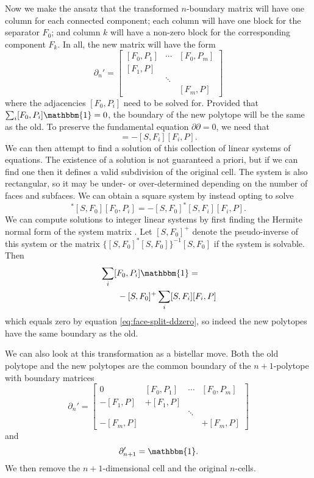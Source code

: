\documentclass[twocolumn]{article}
\begin{document}
Now we make the ansatz that the transformed $n$-boundary matrix will have one column for each connected component; each column will have one block for the separator $F_0$; and column $k$ will have a non-zero block for the corresponding component $F_k$.
In all, the new matrix will have the form
\begin{equation}
    \partial_n' = \left[\begin{matrix}[F_0, P_1] & \cdots & [F_0, P_m] \\ [F_1, P] & & \\ & \ddots & \\ & & [F_m, P]\end{matrix}\right]
\end{equation}
where the adjacencies $[F_0, P_i]$ need to be solved for.
Provided that $\sum_i[F_0, P_i]\mathbbm{1} = 0$, the boundary of the new polytope will be the same as the old.
To preserve the fundamental equation $\partial\partial = 0$, we need that
\begin{equation}
    [S, F_0][F_0, P_i] = -[S, F_i][F_i, P].
\end{equation}
We can then attempt to find a solution of this collection of linear systems of equations.
The existence of a solution is not guaranteed a priori, but if we can find one then it defines a valid subdivision of the original cell.
The system is also rectangular, so it may be under- or over-determined depending on the number of faces and subfaces.
We can obtain a square system by instead opting to solve
\begin{equation}
    [S, F_0]^*[S, F_0][F_0, P_i] = -[S, F_0]^*[S, F_i][F_i, P].
    \label{eq:face-split-normal-eqn}
\end{equation}
We can compute solutions to integer linear systems by first finding the Hermite normal form of the system matrix \cite{kannan1979polynomial}.
Let $[S, F_0]^+$ denote the pseudo-inverse of this system or the matrix $\{[S, F_0]^*[S, F_0]\}^{-1}[S, F_0]$ if the system is solvable.
Then
\begin{align}
    & \sum_i[F_0, P_i]\mathbbm{1} = \nonumber\\
    & \quad\quad -[S, F_0]^+\sum_i[S, F_i][F_i, P]
\end{align}
which equals zero by equation \eqref{eq:face-split-ddzero}, so indeed the new polytopes have the same boundary as the old.

We can also look at this transformation as a bistellar move.
Both the old polytope and the new polytopes are the common boundary of the $n + 1$-polytope with boundary matrices
\begin{equation}
    \partial_n' = \left[\begin{matrix}0 & [F_0, P_1] & \cdots & [F_0, P_m] \\ -[F_1, P] & +[F_1, P] & & \\ & & \ddots & \\ -[F_m, P] & & & +[F_m, P]\end{matrix}\right]
\end{equation}
and
\begin{equation}
    \partial_{n + 1}' = \mathbbm{1}.
\end{equation}
We then remove the $n + 1$-dimensional cell and the original $n$-cells.
\end{document}
